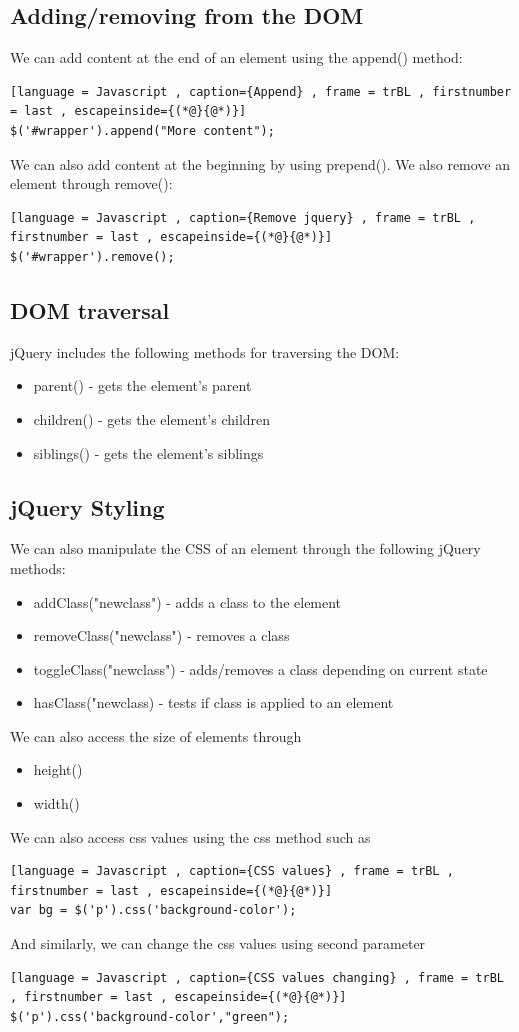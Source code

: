 \documentclass[a4paper]{article}
\theoremstyle{plain}
\theoremstyle{definition}
\theoremstyle{remark}
\begin{document}
\begin{flushleft}
\subsection{Adding/removing from the DOM}
We can add content at the end of an element using the append() method:
\begin{lstlisting}[language = Javascript , caption={Append} , frame = trBL , firstnumber = last , escapeinside={(*@}{@*)}]
$('#wrapper').append("More content");
\end{lstlisting}
We can also add content at the beginning by using prepend(). We also remove an element through remove():
\begin{lstlisting}[language = Javascript , caption={Remove jquery} , frame = trBL , firstnumber = last , escapeinside={(*@}{@*)}]
$('#wrapper').remove();
\end{lstlisting}
\subsection{DOM traversal}
jQuery includes the following methods for traversing the DOM:
\begin{itemize}
	\item parent() - gets the element's parent
	\item children() - gets the element's children
	\item siblings() - gets the element's siblings
\end{itemize}
\subsection{jQuery Styling}
We can also manipulate the CSS of an element through the following jQuery methods:
\begin{itemize}
	\item addClass("newclass") - adds a class to the element
	\item removeClass("newclass") - removes a class
	\item toggleClass("newclass") - adds/removes a class depending on current state
	\item hasClass("newclass) - tests if class is applied to an element
\end{itemize}
We can also access the size of elements through
\begin{itemize}
	\item height()
	\item width()
\end{itemize}
We can also access css values using the css method such as
\begin{lstlisting}[language = Javascript , caption={CSS values} , frame = trBL , firstnumber = last , escapeinside={(*@}{@*)}]
var bg = $('p').css('background-color');
\end{lstlisting}
And similarly, we can change the css values using second parameter
\begin{lstlisting}[language = Javascript , caption={CSS values changing} , frame = trBL , firstnumber = last , escapeinside={(*@}{@*)}]
$('p').css('background-color',"green");
\end{lstlisting}

\end{flushleft}
\end{document}
